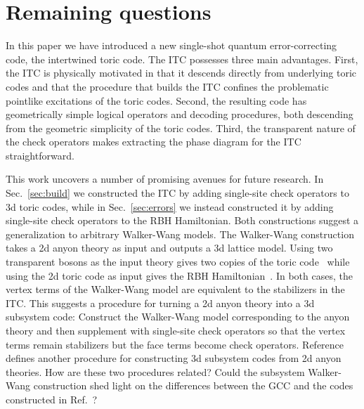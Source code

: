 \section{Remaining questions} \label{sec:questions}

In this paper we have introduced a new single-shot quantum error-correcting code, the intertwined toric code. The ITC possesses three main advantages. First, the ITC is physically motivated  in that it descends directly from underlying toric codes and that the procedure that builds the ITC confines the problematic pointlike excitations of the toric codes. Second, the resulting code has geometrically simple logical operators and decoding procedures, both descending from the geometric simplicity of the toric codes. Third, the transparent nature of the check operators makes extracting the phase diagram for the ITC straightforward. 

This work uncovers a number of promising avenues for future research. 
In Sec.~\ref{sec:build} we constructed the ITC by adding single-site check operators to 3d toric codes, while in Sec.~\ref{sec:errors} we instead constructed it by adding single-site check operators to the RBH Hamiltonian. Both constructions suggest a generalization to arbitrary Walker-Wang models. The Walker-Wang construction~\cite{WalkerWang2011} takes a 2d anyon theory as input and outputs a 3d lattice model. Using two transparent bosons as the input theory gives two copies of the toric code~\cite{vonKeyserlingk2013SurfaceAnyons} while using the 2d toric code as input gives the RBH Hamiltonian~\cite{Roberts20203Fermion}. In both cases, the vertex terms of the Walker-Wang model are equivalent to the stabilizers in the ITC.
This suggests a procedure for turning a 2d anyon theory into a 3d subsystem code: Construct the Walker-Wang model corresponding to the anyon theory and then supplement with single-site check operators so that the vertex terms remain stabilizers but the face terms become check operators. Reference~\cite{Bridgeman2023Lifting} defines another procedure for constructing 3d subsystem codes from 2d anyon theories. How are these two procedures related? Could the subsystem Walker-Wang construction shed light on the differences between the GCC and the codes constructed in Ref.~\cite{Bridgeman2023Lifting}?

